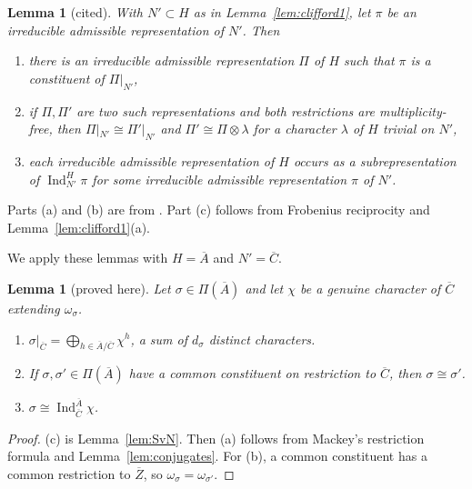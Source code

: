 \documentclass[12pt,letterpaper]{article}
\numberwithin{equation}{section}
\newtheorem{lemma}[theorem]{Lemma}
\theoremstyle{definition}
\newcommand{\proved}{proved here}
\newcommand{\cited}{cited}
\newcommand{\bA}{\overline{A}}
\newcommand{\bC}{\overline{C}}
\newcommand{\bZ}{\overline{Z}}
\DeclareMathOperator{\Ind}{Ind}
\begin{document}
\begin{lemma}[\cited]\label{lem:clifford2}
With $N'\subset H$ as in Lemma~\ref{lem:clifford1}, let $\pi$ be an irreducible admissible
representation of $N'$.  Then
\begin{enumerate}[label=(\alph*),leftmargin=*,itemsep=1pt]
\item there is an irreducible admissible representation $\Pi$ of $H$ such that $\pi$ is a
constituent of $\Pi|_{N'}$,
\item if $\Pi,\Pi'$ are two such representations and both restrictions are
multiplicity-free, then $\Pi|_{N'}\cong\Pi'|_{N'}$ and $\Pi'\cong\Pi\otimes\lambda$ for a
character $\lambda$ of $H$ trivial on $N'$,
\item each irreducible admissible representation of $H$ occurs as a subrepresentation of
$\Ind_{N'}^H\pi$ for some irreducible admissible representation $\pi$ of $N'$.
\end{enumerate}
\end{lemma}
Parts (a) and (b) are from \cite[\S2]{GK82}.  Part (c) follows from Frobenius
reciprocity and Lemma~\ref{lem:clifford1}(a).

We apply these lemmas with $H=\bA$ and $N'=\bC$.

\begin{lemma}[\proved]\label{lem:restrict}
Let $\sigma\in\Pi(\bA)$ and let $\chi$ be a genuine character of $\bC$ extending
$\omega_\sigma$.
\begin{enumerate}[label=(\alph*),leftmargin=*,itemsep=1pt]
\item $\sigma|_{\bC}=\bigoplus_{h\in\bA/\bC}\chi^h$, a sum of $d_\sigma$ distinct characters.
\item If $\sigma,\sigma'\in\Pi(\bA)$ have a common constituent on restriction to $\bC$, then
$\sigma\cong\sigma'$.
\item $\sigma\cong\Ind_{\bC}^{\bA}\chi$.
\end{enumerate}
\end{lemma}
\begin{proof}
(c) is Lemma~\ref{lem:SvN}.  Then (a) follows from Mackey's restriction formula and
Lemma~\ref{lem:conjugates}.  For (b), a common constituent has a common restriction to
$\bZ$, so $\omega_\sigma=\omega_{\sigma'}$.
\end{proof}
\end{document}
